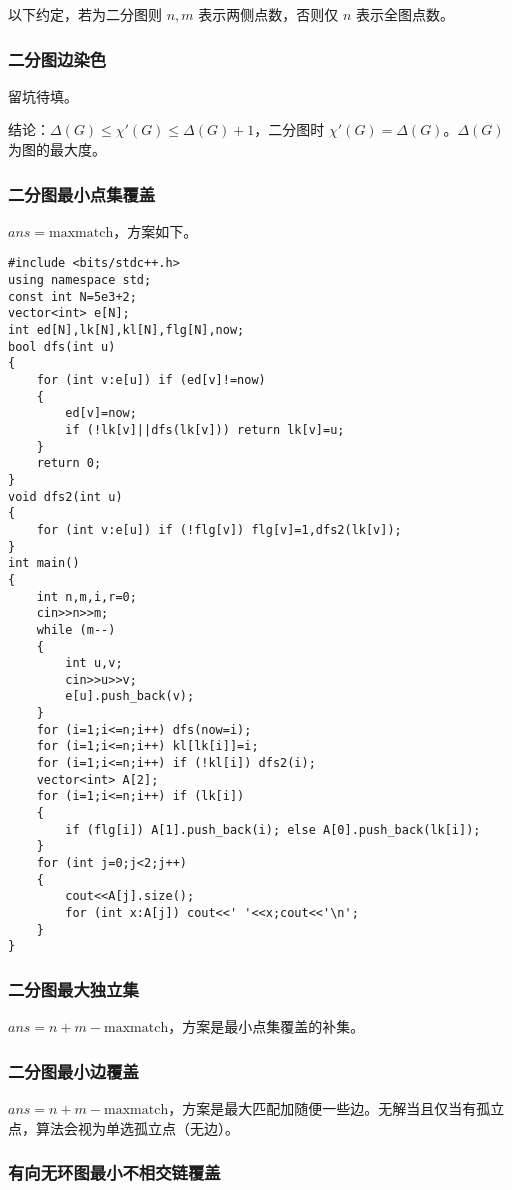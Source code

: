 \documentclass{ctexart}
\begin{document}
以下约定，若为二分图则 $n,m$ 表示两侧点数，否则仅 $n$ 表示全图点数。

\subsubsection{二分图边染色}

留坑待填。

结论：$\Delta(G)\le \chi'(G) \le \Delta(G)+1$，二分图时 $\chi'(G)=\Delta(G)$。$\Delta(G)$ 为图的最大度。

\subsubsection{二分图最小点集覆盖}

$ans=\text{maxmatch}$，方案如下。

\begin{lstlisting}
#include <bits/stdc++.h>
using namespace std;
const int N=5e3+2;
vector<int> e[N];
int ed[N],lk[N],kl[N],flg[N],now;
bool dfs(int u)
{
	for (int v:e[u]) if (ed[v]!=now)
	{
		ed[v]=now;
		if (!lk[v]||dfs(lk[v])) return lk[v]=u;
	}
	return 0;
}
void dfs2(int u)
{
	for (int v:e[u]) if (!flg[v]) flg[v]=1,dfs2(lk[v]);
}
int main()
{
	int n,m,i,r=0;
	cin>>n>>m;
	while (m--)
	{
		int u,v;
		cin>>u>>v;
		e[u].push_back(v);
	}
	for (i=1;i<=n;i++) dfs(now=i);
	for (i=1;i<=n;i++) kl[lk[i]]=i;
	for (i=1;i<=n;i++) if (!kl[i]) dfs2(i);
	vector<int> A[2];
	for (i=1;i<=n;i++) if (lk[i])
	{
		if (flg[i]) A[1].push_back(i); else A[0].push_back(lk[i]);
	}
	for (int j=0;j<2;j++)
	{
		cout<<A[j].size();
		for (int x:A[j]) cout<<' '<<x;cout<<'\n';
	}
}
\end{lstlisting}

\subsubsection{二分图最大独立集}

$ans=n+m-\text{maxmatch}$，方案是最小点集覆盖的补集。

\subsubsection{二分图最小边覆盖}

$ans=n+m-\text{maxmatch}$，方案是最大匹配加随便一些边。无解当且仅当有孤立点，算法会视为单选孤立点（无边）。

\subsubsection{有向无环图最小不相交链覆盖}
\end{document}
